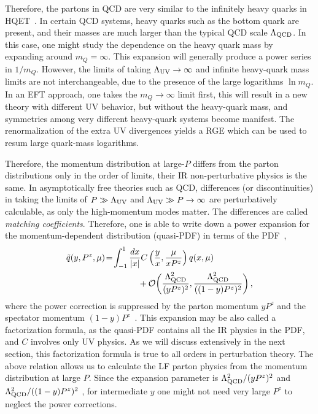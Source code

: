 \documentclass[aps,rmp,reprint,amsmath,amssymb,graphicx,longbibliography]{revtex4-1} %
\begin{document}
Therefore, the partons in QCD are very similar
to the infinitely heavy quarks in HQET~\cite{Manohar:2000dt}. In certain
QCD systems, heavy quarks such as the bottom quark are present, and their
masses are much larger than the typical QCD scale $\Lambda_{\rm QCD}$.
In this case, one might study the dependence on the heavy quark mass
by expanding around $m_Q=\infty$. This expansion will generally
produce a power series in $1/m_Q$. However, the limits
of taking $\Lambda_{\rm UV}\to\infty$ and infinite heavy-quark
mass {limits} are not interchangeable, due to the presence
of the large logarithms $\ln m_Q$. In an EFT approach,
one takes the $m_Q\to\infty$ limit first, this will result in
a new theory with different UV behavior, but without the heavy-quark
mass, and symmetries among very different heavy-quark
systems become manifest. The renormalization
of the extra UV divergences yields a RGE
which can be used to resum large quark-mass logarithms.

Therefore, the momentum distribution at large-$P$ differs
from the parton distributions only in the order
of limits, their IR non-perturbative physics is
the same. In asymptotically free theories such as QCD, differences (or discontinuities) in taking the limits of $P\gg \Lambda_{\rm UV}$ and $\Lambda_{\rm UV} \gg P\to\infty$ are
perturbatively calculable, as only the high-momentum modes matter.
The differences are called {\it matching coefficients}.
Therefore, one is able to write down a power expansion for the momentum-dependent distribution (quasi-PDF) in terms of the PDF~\cite{Xiong:2013bka,Ma:2014jla,Ma:2017pxb,Izubuchi:2018srq},
\begin{align}\label{eq:fact_0}
	\tilde q(y, P^z, \mu)\! &=\! \int_{-1}^{1} \frac{dx}{|x|} C\left(\frac{y}{x}, \frac{\mu}{xP^z}\right) q(x,\mu)
	\nonumber \\
	&\qquad\qquad + {\cal O}\bigg(\frac{\Lambda_{\text{QCD}}^2}{(yP^z)^2},
	\frac{\Lambda_{\text{QCD}}^2}{((1-y)P^z)^2}
	\bigg)\,,
\end{align}
where the power correction is suppressed by the parton momentum $yP^z$ and  the spectator momentum $(1-y)P^z$~\cite{Ji:2020brr}.
This expansion {may be} also called
a factorization formula, as the quasi-PDF contains all the IR physics in the PDF, and $C$ involves only UV physics.
As we will discuss extensively in
the next section, this factorization formula is true to all orders in perturbation theory.
The above relation allows us to calculate the
LF parton physics from the momentum distribution at large
$P$. Since the expansion parameter is $\Lambda_{\rm QCD}^2/(yP^z)^2$ and $\Lambda_{\rm QCD}^2/((1-y)P^z)^2$ ,
for intermediate $y$ one might not need very large $P^z$ to neglect
the power corrections.
\end{document}

